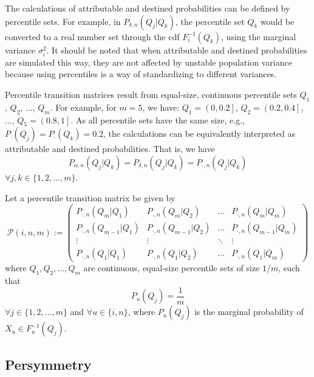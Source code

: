 \documentclass{svproc} %
\begin{document}
The calculations of attributable and destined probabilities can be defined by percentile sets. For example, in $P_{\delta , n}(Q_j | Q_k)$, the percentile set $Q_k$ would be converted to a real number set through the cdf $F_i^{-1}(Q_k)$, using the marginal variance $\sigma_i^2$. It should be noted that when attributable and destined probabilities are simulated this way, they are not affected by unstable population variance because using percentiles is a way of standardizing to different variances. 

Percentile transition matrices result from equal-size, continuous percentile sets $Q_1$, $Q_2$, ..., $Q_m$. For example, for $m=5$, we have: $Q_1 = \left(0, 0.2\right]$, $Q_2 = \left(0.2, 0.4\right]$, ..., $Q_5 = \left(0.8, 1\right]$. As all percentile sets have the same size, e.g., $P_{\cdot}(Q_j) = P_{\cdot}(Q_k) = 0.2$, the calculations can be equivalently interpreted as attributable and destined probabilities. That is, we have 
\begin{equation}
P_{\alpha , n}(Q_j | Q_k) = P_{\delta , n}(Q_j | Q_k) = P_{\cdot , n}(Q_j | Q_k)
\label{eq:ad_eq}
\end{equation}
$\forall j, k \in \{1, 2, \dots , m\}$.


\begin{definition}
Let a percentile transition matrix be given by 
\begin{equation}
\mathcal{P}(i, n, m) := 
\begin{pmatrix}
P_{\cdot , n}(Q_m | Q_1) &  P_{\cdot , n}(Q_m | Q_2)  & \ldots & P_{\cdot , n}(Q_m | Q_m)\\
P_{\cdot , n}(Q_{m-1} | Q_1)  &  P_{\cdot , n}(Q_{m-1} | Q_2) & \ldots & P_{\cdot , n}(Q_{m-1} | Q_m)\\
\vdots & \vdots & \ddots & \vdots\\
P_{\cdot , n}(Q_1 | Q_1)  &   P_{\cdot , n}(Q_1 | Q_2)       &\ldots & P_{\cdot , n}(Q_1 | Q_m) 
\end{pmatrix}
\label{eq:ptm}
\end{equation}
where $Q_1, Q_2, \dots , Q_m$ are continuous, equal-size percentile sets of size $1/m$, such that 
\begin{equation}
P_u(Q_j) = \frac{1}{m}
\label{eq:size}
\end{equation}
$\forall j \in \{1, 2, \dots , m\}$ and $\forall u \in \{i, n\}$, where $P_u(Q_j)$ is the marginal probability of $X_u \in F_u^{-1}(Q_j)$.
\label{def:ptm}
\end{definition}

 
\subsection{Persymmetry} \label{persymmetry}
\end{document}

